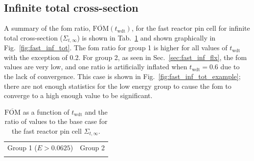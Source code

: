 \subsection{Infinite total cross-section}
\label{sec:fast_inf_tot_cross_section}
A summary of the \gls{fom} ratio,
$\overline{\mathrm{FOM}}(t_{\mathrm{wdt}})$, for the fast reactor pin
cell for infinite total cross-section ($\Sigma_{t,
  \infty}$) is shown in Tab.~\ref{tab:fast_inf_tot} and shown
graphically in Fig.~\ref{fig:fast_inf_tot}. The \gls{fom} ratio for
group 1 is higher for all values of $t_{\mathrm{wdt}}$ with the
exception of 0.2. For group 2, as seen in Sec.~\ref{sec:fast_inf_flx}, the
\gls{fom} values are very low, and one ratio is artificially inflated
when $t_{\mathrm{wdt}} = 0.6$
due to the lack of convergence. This case is shown in
Fig.~\ref{fig:fast_inf_tot_example}; there are not enough statistics
for the low energy group to cause the \gls{fom} to converge to a high
enough value to be significant.
\begin{table}[hbtp]
  \centering
  \caption[$\overline{\mathrm{FOM}}$ and ratio for
    the fast reactor pin cell $\Sigma_{t,\infty}$.]{$\overline{\mathrm{FOM}}$ as a function of
    $t_{\mathrm{wdt}}$ and the ratio of values to the base case for
    the fast reactor pin cell $\Sigma_{t,\infty}$.}
  \begin{tabular}{cc} Group 1 ($E > 0.0625$) & Group 2 \\
    
 &
   
  \end{tabular}
\label{tab:fast_inf_tot}
\end{table}
